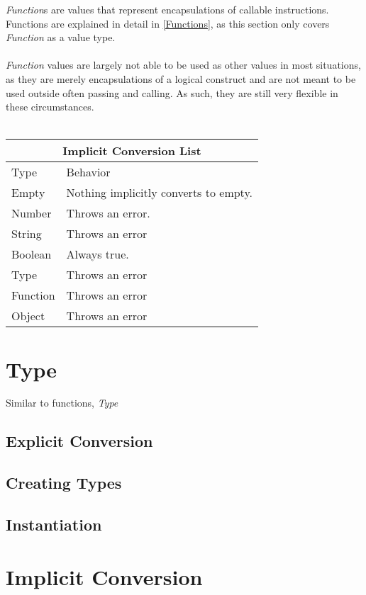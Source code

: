 \documentclass[12pt,letterpaper]{report}
\begin{document}
\textit{Function}s are values that represent encapsulations of callable instructions. Functions are
explained in detail in \autoref{Functions}, as this section only covers \textit{Function} as 
a value type.
\\\\
\textit{Function} values are largely not able to be used as other values in most situations, as 
they are merely encapsulations of a logical construct and are not meant to be used outside often
passing and calling. As such, they are still very flexible in these circumstances.
\\\\
{
\centering
\begin{tabular}{ |p{2.5cm}||p{10cm}|  }
  \hline
  \multicolumn{2}{|c|}{Implicit Conversion List} \\
  \hline
  Type & Behavior\\
  \hline
  Empty & Nothing implicitly converts to empty.\\
  Number  & Throws an error. \\
  String & Throws an error\\
  Boolean & Always true. \\
  Type & Throws an error\\
  Function & Throws an error\\
  Object & Throws an error\\
 \hline
\end{tabular}
}

\section{Type}\label{Type}

Similar to functions, \textit{Type}



\subsection{Explicit Conversion}\label{Explicit Conversion}
\subsection{Creating Types}\label{Creating Types}
\subsection{Instantiation}\label{Instantiation}
\section{Implicit Conversion}\label{Implicit Conversion}
\end{document}
